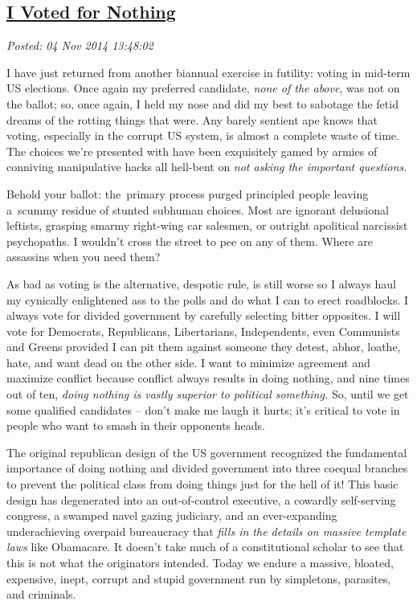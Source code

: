 %

\subsection*{\href{http://bakerjd99.wordpress.com/2014/11/04/i-voted-for-nothing/}{I Voted for Nothing}}


\noindent\emph{Posted: 04 Nov 2014 13:48:02}
\vspace{6pt}

I have just returned from another biannual exercise in futility: voting
in mid-term US elections. Once again my preferred candidate, \emph{none
of the above}, was not on the ballot; so, once again, I held my nose and
did my best to sabotage the fetid dreams of the rotting things that
were. Any barely sentient ape knows that voting, especially in the
corrupt US system, is almost a complete waste of time. The choices we're
presented with have been exquisitely gamed by armies of conniving
manipulative hacks all hell-bent on \emph{not asking the important
questions.}

Behold your ballot: the~primary process purged principled people leaving
a~scummy residue of stunted subhuman choices. Most are ignorant
delusional leftists, grasping smarmy right-wing car salesmen, or
outright apolitical narcissist psychopaths. I wouldn't cross the street
to pee on any of them. Where are assassins when you need them?

As bad as voting is the alternative, despotic rule, is still worse so I
always haul my cynically enlightened ass to the polls and do what I can
to erect roadblocks. I always vote for divided government by carefully
selecting bitter opposites. I will vote for Democrats, Republicans,
Libertarians, Independents, even Communists and Greens provided I can
pit them against someone they detest, abhor, loathe, hate, and want dead
on the other side. I want to minimize agreement and maximize conflict
because conflict always results in doing nothing, and nine times out of
ten, \emph{doing nothing is vastly superior to political something.} So,
until we get some qualified candidates -- don't make me laugh it hurts;
it's critical to vote in people who want to smash in their opponents
heads.

The original republican design of the US government recognized the
fundamental importance of doing nothing and divided government into
three coequal branches to prevent the political class from doing things
just for the hell of it! This basic design has degenerated into an
out-of-control executive, a cowardly self-serving congress, a swamped
navel gazing judiciary, and an ever-expanding underachieving overpaid
bureaucracy that \emph{fills in the details on massive template laws}
like Obamacare. It doesn't take much of a constitutional scholar to see
that this is not what the originators intended. Today we endure a
massive, bloated, expensive, inept, corrupt and stupid government run by
simpletons, parasites, and criminals.


